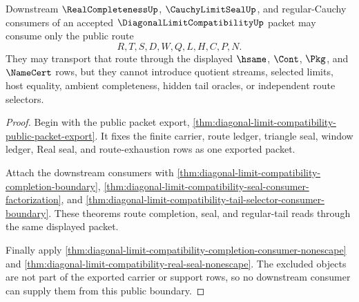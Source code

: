 \begin{theorem}
\label{thm:diagonal-limit-compatibility-downstream-public-boundary}
Downstream $\RealCompletenessUp$, $\CauchyLimitSealUp$, and regular-Cauchy consumers of an accepted $\DiagonalLimitCompatibilityUp$ packet may consume only the public route
$$
R,T,S,D,W,Q,L,H,C,P,N.
$$
They may transport that route through the displayed $\hsame$, $\Cont$, $\Pkg$, and $\NameCert$ rows, but they cannot introduce quotient streams, selected limits, host equality, ambient completeness, hidden tail oracles, or independent route selectors.
\end{theorem}
\begin{proof}
Begin with the public packet export, \autoref{thm:diagonal-limit-compatibility-public-packet-export}. It fixes the finite carrier, route ledger, triangle seal, window ledger, Real seal, and route-exhaustion rows as one exported packet.

Attach the downstream consumers with \autoref{thm:diagonal-limit-compatibility-completion-boundary}, \autoref{thm:diagonal-limit-compatibility-seal-consumer-factorization}, and \autoref{thm:diagonal-limit-compatibility-tail-selector-consumer-boundary}. These theorems route completion, seal, and regular-tail reads through the same displayed packet.

Finally apply \autoref{thm:diagonal-limit-compatibility-completion-consumer-nonescape} and \autoref{thm:diagonal-limit-compatibility-real-seal-nonescape}. The excluded objects are not part of the exported carrier or support rows, so no downstream consumer can supply them from this public boundary.
\end{proof}


